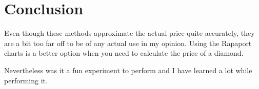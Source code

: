 \documentclass{scrreprt}
\begin{document}
	\chapter{Conclusion}
		Even though these methods approximate the actual price quite accurately, they are a bit too far off to be of any actual use in my opinion. Using the Rapaport charts is a better option when you need to calculate the price of a diamond.\par
		Nevertheless was it a fun experiment to perform and I have learned a lot while performing it.
		
\end{document}
